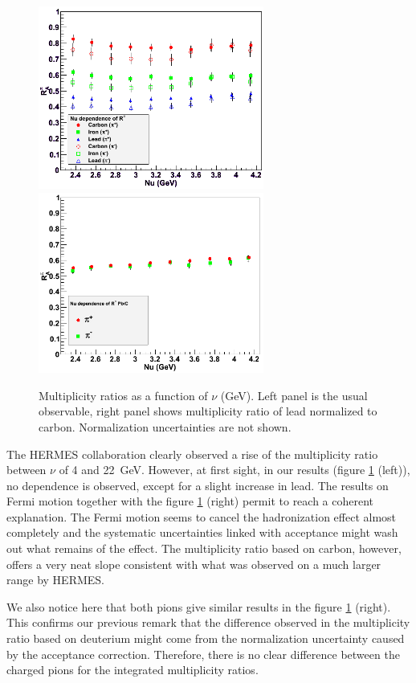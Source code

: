 \begin{figure}[tbp]
\centering
\includegraphics[width=7.4cm] {chap6-fig/F_RvNu.png} 
\includegraphics[width=7.4cm] {chap6-fig/F_RvNu_PbC.png} 
\caption{Multiplicity ratios as a function of $\nu$ (GeV). Left panel is the usual 
observable, right panel shows multiplicity ratio of lead normalized to carbon. 
Normalization uncertainties are not shown.}
\label{fig:RNu}
\end{figure}

The HERMES collaboration clearly observed a rise of the multiplicity ratio 
between $\nu$ of 4 and 22~GeV. However, at first sight, in our results (figure 
\ref{fig:RNu} (left)), no dependence is observed, except for a 
slight increase in lead. The results on Fermi motion together 
with the figure \ref{fig:RNu} (right) permit to reach a coherent explanation. The 
Fermi motion seems to cancel the hadronization effect almost completely and the
systematic uncertainties linked with acceptance might wash out what remains of the effect. The 
multiplicity ratio based on carbon, however, offers a very neat slope consistent 
with what was observed on a much larger range by HERMES.

We also notice here that both pions give similar results in the figure 
\ref{fig:RNu} (right). This confirms our previous remark that the difference 
observed in the multiplicity ratio based on deuterium might come from the 
normalization uncertainty caused by the acceptance correction. Therefore, there is no 
clear difference between the charged pions for the integrated multiplicity 
ratios.


